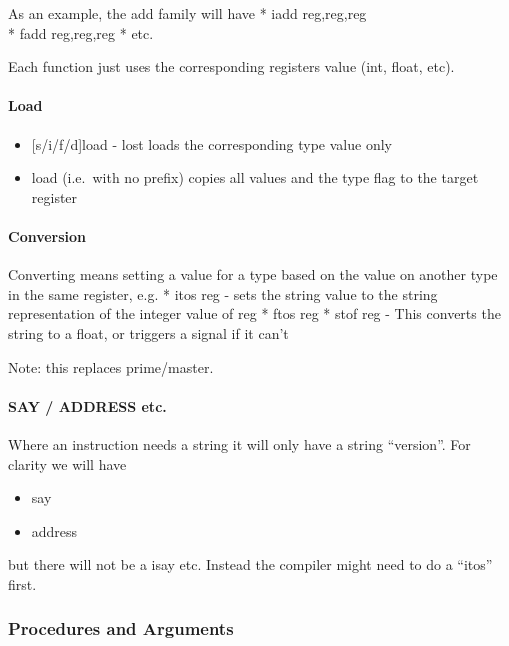 As an example, the add family will have * iadd reg,reg,reg\\
* fadd reg,reg,reg * etc.

Each function just uses the corresponding registers value (int, float,
etc).

\hypertarget{load}{%
\paragraph{Load}\label{load}}

\begin{itemize}
\tightlist
\item
  {[}s/i/f/d{]}load - lost loads the corresponding type value only
\item
  load (i.e.~with no prefix) copies all values and the type flag to the
  target register
\end{itemize}

\hypertarget{conversion}{%
\paragraph{Conversion}\label{conversion}}

Converting means setting a value for a type based on the value on
another type in the same register, e.g. * itos reg - sets the string
value to the string representation of the integer value of reg * ftos
reg * stof reg - This converts the string to a float, or triggers a
signal if it can't

Note: this replaces prime/master.

\hypertarget{say-address-etc.}{%
\paragraph{SAY / ADDRESS etc.}\label{say-address-etc.}}

Where an instruction needs a string it will only have a string
``version''. For clarity we will have

\begin{itemize}
\tightlist
\item
  say
\item
  address
\end{itemize}

but there will not be a isay etc. Instead the compiler might need to do
a ``itos'' first.

\hypertarget{procedures-and-arguments}{%
\subsubsection{Procedures and
Arguments}\label{procedures-and-arguments}}

